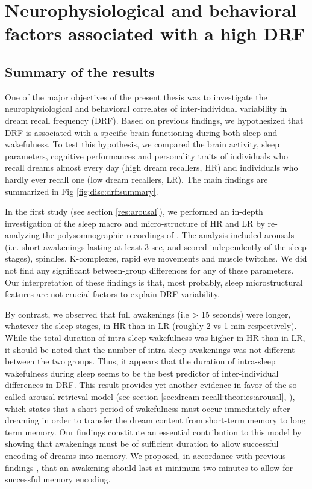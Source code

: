 \cleardoublepage
\chapter{Neurophysiological and behavioral factors associated with a high DRF}
\label{disc:drf}

\section{Summary of the results}
\label{disc:drf:summary}

One of the major objectives of the present thesis was to investigate the neurophysiological and behavioral correlates of inter-individual variability in dream recall frequency (DRF). Based on previous findings, we hypothesized that DRF is associated with a specific brain functioning during both sleep and wakefulness. To test this hypothesis, we compared the brain activity, sleep parameters, cognitive performances and personality traits of individuals who recall dreams almost every day (high dream recallers, HR) and individuals who hardly ever recall one (low dream recallers, LR). The main findings are summarized in Fig \ref{fig:disc:drf:summary}.

In the first study (see section \ref{res:arousal}), we performed an in-depth investigation of the sleep macro and micro-structure of HR and LR by re-analyzing the polysomnographic recordings of  \citet{eichenlaub_brain_2014}. The analysis included arousals (i.e. short awakenings lasting at least 3 sec, and scored independently of the sleep stages), spindles, K-complexes, rapid eye movements and muscle twitches. We did not find any significant between-group differences for any of these parameters. Our interpretation of these findings is that, most probably, sleep microstructural features are not crucial factors to explain DRF variability.

By contrast, we observed that full awakenings (i.e > 15 seconds) were longer, whatever the sleep stages, in HR than in LR (roughly 2 vs 1 min respectively). While the total duration of intra-sleep wakefulness was higher in HR than in LR, it should be noted that the number of intra-sleep awakenings was not different between the two groups. Thus, it appears that the duration of intra-sleep wakefulness during sleep seems to be the best predictor of inter-individual differences in DRF. This result provides yet another evidence in favor of the so-called arousal-retrieval model (see section \ref{sec:dream-recall:theories:arousal}, \citealp{koulack_dream_1976}), which states that a short period of wakefulness must occur immediately after dreaming in order to transfer the dream content from short-term memory to long term memory. Our findings constitute an essential contribution to this model by showing that awakenings must be of sufficient duration to allow successful encoding of dreams into memory. We proposed, in accordance with previous findings \citep{campbell_perception_1981}, that an awakening should last at minimum two minutes to allow for successful memory encoding.


